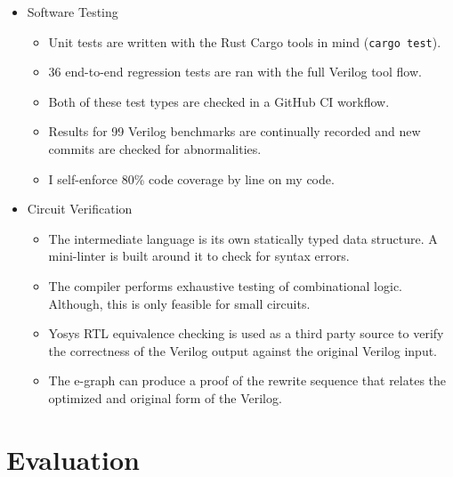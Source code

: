 \documentclass[10pt,letterpaper]{article}
\begin{document}
\begin{itemize}
    \item Software Testing
          \begin{itemize}
              \item Unit tests are written with the Rust Cargo tools in mind (\texttt{cargo test}).
              \item 36 end-to-end regression tests are ran with the full Verilog tool flow.
              \item Both of these test types are checked in a GitHub CI workflow.
              \item Results for 99 Verilog benchmarks are continually recorded and new commits are
                    checked for abnormalities.
              \item I self-enforce 80\% code coverage by line on my code.
          \end{itemize}
    \item Circuit Verification
          \begin{itemize}
              \item The intermediate language is its own statically typed data structure. A
                    mini-linter is built around it to check for syntax errors.
              \item The compiler performs exhaustive testing of combinational logic. Although, this
                    is only feasible for small circuits.
              \item Yosys RTL equivalence checking is used as a third party source to verify the
                    correctness of the Verilog output against the original Verilog input.
              \item The e-graph can produce a proof of the rewrite sequence that relates the
                    optimized and original form of the Verilog.
          \end{itemize}
\end{itemize}

\section{Evaluation}\label{sec:evaluation}
\end{document}
